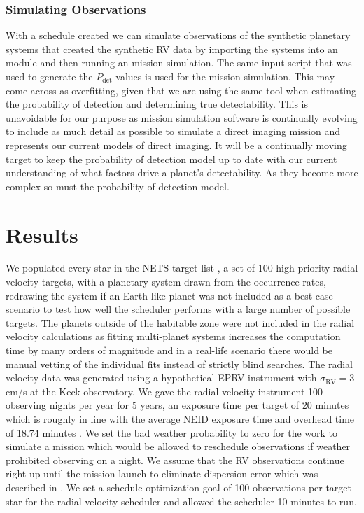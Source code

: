 \subsubsection{Simulating Observations}

With a schedule created we can simulate observations of the synthetic planetary
systems that created the synthetic RV data by importing the systems into an
  module and then running an
 mission simulation. The same  input script that
was used to generate the $P_\textrm{det}$ values is used for the mission
simulation. This may come across as overfitting, given that we are using the
same tool when estimating the probability of detection and determining true
detectability. This is unavoidable for our purpose as mission simulation
software is continually evolving to include as much detail as possible to
simulate a direct imaging mission and represents our current models of direct
imaging. It will be a continually moving target to keep the probability of
detection model up to date with our current understanding of what factors drive
a planet's detectability. As they become more complex so must the probability
of detection model.

\section{Results}

We populated every star in the NETS target list
\citep{guptaTargetPrioritization2021}, a set of 100 high priority radial
velocity targets, with a planetary system drawn from the
\citet{dulzJointRadialVelocity2020} occurrence rates, redrawing the system if
an Earth-like planet was not included as a best-case scenario to test how well
the scheduler performs with a large number of possible targets. The planets
outside of the habitable zone were not included in the radial velocity
calculations as fitting multi-planet systems increases the computation time by
many orders of magnitude and in a real-life scenario there would be manual
vetting of the individual fits instead of strictly blind searches. The radial
velocity data was generated using a hypothetical EPRV instrument with
$\sigma_\textrm{RV} = 3$ cm/s at the Keck observatory. We gave the radial
velocity instrument 100 observing nights per year for 5 years, an exposure time
per target of 20 minutes which is roughly in line with the average NEID
exposure time and overhead time of 18.74 minutes
\citep{guptaTargetPrioritization2021}. We set the bad weather probability to
zero for the work to simulate a mission which would be allowed to reschedule
observations if weather prohibited observing on a night. We assume that the RV
observations continue right up until the mission launch to eliminate dispersion
error which was described in . We set a schedule
optimization goal of 100 observations per target star for the radial velocity
scheduler and allowed the scheduler 10 minutes to run.

